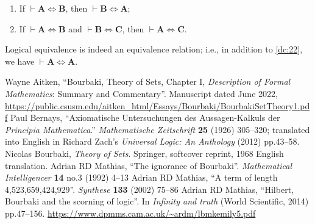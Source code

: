 \documentclass{amsart}%
\newcommand\metavariable[1]{\boldsymbol{#1}}
\begin{document}
\begin{dc}\label{dc:22}
\begin{enumerate}
\item If $\vdash\metavariable{A}\iff\metavariable{B}$, then $\vdash\metavariable{B}\iff\metavariable{A}$;
\item If $\vdash\metavariable{A}\iff\metavariable{B}$ and $\vdash\metavariable{B}\iff\metavariable{C}$,
  then $\vdash\metavariable{A}\iff\metavariable{C}$.
\end{enumerate}
\end{dc}

\begin{lemma}
Logical equivalence is indeed an equivalence relation; i.e., in addition
to \ref{dc:22}, we have $\vdash\metavariable{A}\iff\metavariable{A}$.
\end{lemma}


\begin{thebibliography}{99}
 Wayne Aitken,
  ``Bourbaki, Theory of Sets, Chapter I, \textit{Description of Formal Mathematics}: Summary and Commentary''.
  Manuscript dated June 2022,
  \url{https://public.csusm.edu/aitken_html/Essays/Bourbaki/BourbakiSetTheory1.pdf}
 Paul Bernays, ``Axiomatische Untersuchungen des
Aussagen-Kalkuls der \textit{Principia Mathematica}.''
\textit{Mathematische Zeitschrift} \textbf{25} (1926) 305--320;
translated into English in Richard Zach's \textit{Universal Logic: An
  Anthology} (2012) pp.43--58.
 Nicolas Bourbaki,
  \textit{Theory of Sets}.
  Springer, softcover reprint, 1968 English translation.
  Adrian RD Mathias,
  ``The ignorance of Bourbaki''.
  \textit{Mathematical Intelligencer} \textbf{14} no.3 (1992) 4--13
  Adrian RD Mathias,
  ``A term of length 4,523,659,424,929''.
  \textit{Synthese} \textbf{133} (2002) 75--86
  Adrian RD Mathias,
  ``Hilbert, Bourbaki and the scorning of logic''.
  In \textit{Infinity and truth} (World Scientific, 2014) pp.47--156.
  \url{https://www.dpmms.cam.ac.uk/~ardm/lbmkemily5.pdf}

\end{thebibliography}
\end{document}
